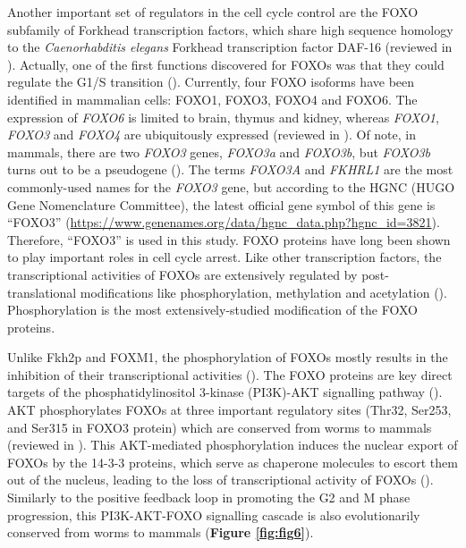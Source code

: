 Another important set of regulators in the cell cycle control are the FOXO subfamily of Forkhead transcription factors, which share high sequence homology to the \textit{Caenorhabditis elegans} Forkhead transcription factor DAF-16 (reviewed in \cite{myatt2007the}). Actually, one of the first functions discovered for FOXOs was that they could regulate the G1/S transition (\cite{medema2000afx-like}). Currently, four FOXO isoforms have been identified in mammalian cells: FOXO1, FOXO3, FOXO4 and FOXO6. The expression of \textit{FOXO6} is limited to brain, thymus and kidney, whereas \textit{FOXO1}, \textit{FOXO3} and \textit{FOXO4} are ubiquitously expressed (reviewed in \cite{greer2005foxo}). Of note, in mammals, there are two \textit{FOXO3} genes, \textit{FOXO3a} and \textit{FOXO3b}, but \textit{FOXO3b} turns out to be a pseudogene (\cite{greer2005foxo}). The terms \textit{FOXO3A} and \textit{FKHRL1} are the most commonly-used names for the \textit{FOXO3} gene, but according to the HGNC (HUGO Gene Nomenclature Committee), the latest official gene symbol of this gene is \enquote{FOXO3} (\url{https://www.genenames.org/data/hgnc_data.php?hgnc_id=3821}). Therefore, \enquote{FOXO3} is used in this study. FOXO proteins have long been shown to play important roles in cell cycle arrest. Like other transcription factors, the transcriptional activities of FOXOs are extensively regulated by post-translational modifications like phosphorylation, methylation and acetylation (\cite{brunet1999akt,matsuzaki2005acetylation,yamagata2008arginine}). Phosphorylation is the most extensively-studied modification of the FOXO proteins.

Unlike Fkh2p and FOXM1, the phosphorylation of FOXOs mostly results in the inhibition of their transcriptional activities (\cite{brunet1999akt}). The FOXO proteins are key direct targets of the phosphatidylinositol 3-kinase (PI3K)-AKT signalling pathway (\cite{brunet1999akt}). AKT phosphorylates FOXOs at three important regulatory sites (Thr32, Ser253, and Ser315 in FOXO3 protein) which are conserved from worms to mammals (reviewed in \cite{greer2005foxo}). This AKT-mediated phosphorylation induces the nuclear export of FOXOs by the 14-3-3 proteins, which serve as chaperone molecules to escort them out of the nucleus, leading to the loss of transcriptional activity of FOXOs (\cite{brunet1999akt,brunet200214-3-3}). Similarly to the positive feedback loop in promoting the G2 and M phase progression, this PI3K-AKT-FOXO signalling cascade is also evolutionarily conserved from worms to mammals (\textbf{Figure \ref{fig:fig6}}).

